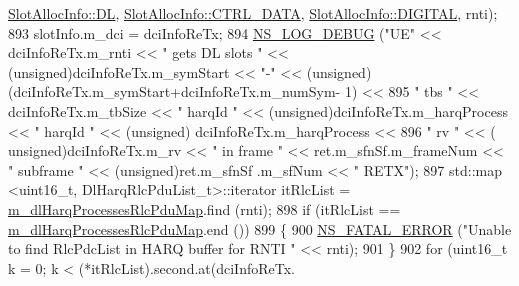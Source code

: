 \begin{DoxyCode}
      \hyperlink{structns3_1_1SlotAllocInfo_a6cad60db1d39034f1851e2cea625fe5da9a365c9c56b7c32dcae38ee1a468ce6d}{SlotAllocInfo::DL}, \hyperlink{structns3_1_1SlotAllocInfo_a3ea7cb503bfd0c9a4df55a71b81b9331a1ea636c3f068558fabacbc39934309b8}{SlotAllocInfo::CTRL\_DATA}, 
      \hyperlink{structns3_1_1SlotAllocInfo_adcbd067d82be6260b3399167d8f0b4eca47a67c342db658a08ded9ce4b49417ea}{SlotAllocInfo::DIGITAL}, rnti);
893                                         slotInfo.m\_dci = dciInfoReTx;
894                                         \hyperlink{group__logging_ga413f1886406d49f59a6a0a89b77b4d0a}{NS\_LOG\_DEBUG} (\textcolor{stringliteral}{"UE"} << dciInfoReTx.m\_rnti << \textcolor{stringliteral}{" gets DL
       slots "} << (\textcolor{keywordtype}{unsigned})dciInfoReTx.m\_symStart << \textcolor{stringliteral}{"-"} << (\textcolor{keywordtype}{unsigned})(dciInfoReTx.m\_symStart+dciInfoReTx.m\_numSym-
      1) <<
895                                                                                                 \textcolor{stringliteral}{" tbs "} << 
      dciInfoReTx.m\_tbSize << \textcolor{stringliteral}{" harqId "} << (\textcolor{keywordtype}{unsigned})dciInfoReTx.m\_harqProcess << \textcolor{stringliteral}{" harqId "} << (\textcolor{keywordtype}{unsigned})
      dciInfoReTx.m\_harqProcess <<
896                                                                                                 \textcolor{stringliteral}{" rv "} << (\textcolor{keywordtype}{
      unsigned})dciInfoReTx.m\_rv << \textcolor{stringliteral}{" in frame "} << ret.m\_sfnSf.m\_frameNum << \textcolor{stringliteral}{" subframe "} << (\textcolor{keywordtype}{unsigned})ret.m\_sfnSf
      .m\_sfNum << \textcolor{stringliteral}{" RETX"});
897                                         std::map <uint16\_t, DlHarqRlcPduList\_t>::iterator itRlcList =  
      \hyperlink{classns3_1_1MmWaveFlexTtiMaxRateMacScheduler_a5eeb7aeecc26d9849aadd3da24e00f68}{m\_dlHarqProcessesRlcPduMap}.find (rnti);
898                                         \textcolor{keywordflow}{if} (itRlcList == 
      \hyperlink{classns3_1_1MmWaveFlexTtiMaxRateMacScheduler_a5eeb7aeecc26d9849aadd3da24e00f68}{m\_dlHarqProcessesRlcPduMap}.end ())
899                                         \{
900                                                 \hyperlink{group__fatal_ga5131d5e3f75d7d4cbfd706ac456fdc85}{NS\_FATAL\_ERROR} (\textcolor{stringliteral}{"Unable to find RlcPdcList in
       HARQ buffer for RNTI "} << rnti);
901                                         \}
902                                         \textcolor{keywordflow}{for} (uint16\_t k = 0; k < (*itRlcList).second.at(dciInfoReTx.

\end{DoxyCode}
